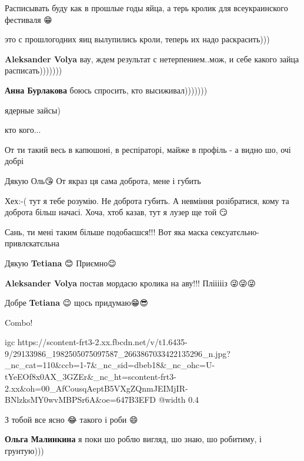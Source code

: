 \begin{itemize} %

Расписывать буду как в прошлые годы яйца, а терь кролик для всеукраинского фестиваля 😁


это с прошлогодних яиц вылупились кроли, теперь их надо раскрасить)))

\textbf{Aleksander Volya} вау, ждем результат с нетерпением..мож, и себе какого зайца расписать)))))))

\textbf{Анна Бурлакова} боюсь спросить, кто высиживал)))))))

\end{itemize} %


ядерные зайсы)


кто кого...


От ти такий весь в капюшоні, в респіраторі, майже в профіль - а видно шо, очі добрі 👀

\begin{itemize} %

Дякую Оль😘 От якраз ця сама доброта, мене і губить🙁


Хех:-( тут я тебе розумію. Не доброта губить. А невміння розібратися, кому та
доброта більш начасі. Хоча, хтоб казав, тут я лузер ще той 😏


Сань, ти мені таким більше подобаєшся!!! Вот яка маска
сексуатєльно-привлєкатєльна🤔😌


Дякую \textbf{Tetiana} 😊 Приємно😉

\textbf{Aleksander Volya} постав мордасю кролика на аву!!! Пліііііз 😜😜😜


Добре \textbf{Tetiana} 😉 щось придумаю😁😎

\end{itemize} %


Combo!

\ifcmt
  igc https://scontent-frt3-2.xx.fbcdn.net/v/t1.6435-9/29133986_1982505075097587_2663867033422135296_n.jpg?_nc_cat=110&ccb=1-7&_nc_sid=dbeb18&_nc_ohc=U-tYeEOf8x0AX_3GZEr&_nc_ht=scontent-frt3-2.xx&oh=00_AfCousqAeptB5VXgZQnmJEIMjIR-BNlzksMY0wvMBPSr6A&oe=647B3EFD
	@width 0.4
\fi

\begin{itemize} %

З тобой все ясно 😂 такого і роби 😄

\textbf{Ольга Малинкина} я поки шо роблю вигляд, шо знаю, шо робитиму, і грунтую)))
\end{itemize} %
